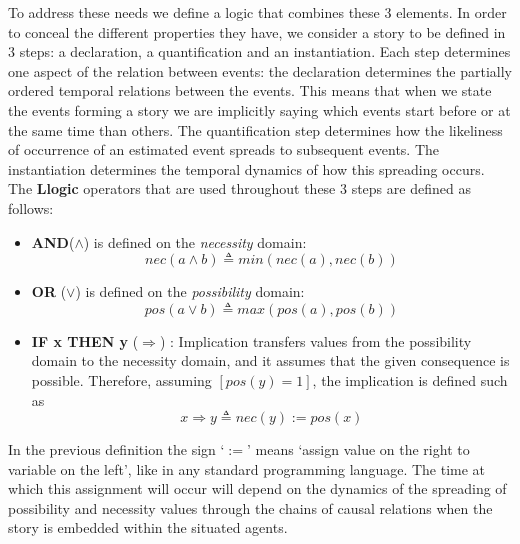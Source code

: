 \documentclass[
		twoside,openright,titlepage,numbers=noenddot,manychapters,
		headinclude,%
                footinclude=false,cleardoublepage=empty,
                BCOR=5mm,
		fontsize=11pt, %
                 enabledeprecatedfontcommands]{scrreprt}
\begin{document}
To address these needs we define a logic that combines these 3 elements. In order to conceal the different properties they have, we consider a story to be defined in 3 steps: a declaration, a quantification and an instantiation.  Each step determines one aspect of the relation between events: the declaration determines the partially ordered temporal relations between the events. This means that when we state the events forming a story we are implicitly saying which events start before or at the same time than others. The quantification step determines how the  likeliness of occurrence of an estimated event spreads to subsequent events. The instantiation determines the temporal dynamics of how this spreading occurs.  %
The \textbf{Llogic} operators that are used throughout these 3 steps %
 are defined as follows:


   \begin{itemize}
        \item  \textbf{AND}($\wedge$) is defined on the \emph{necessity} domain:
\begin{equation*}
 nec(a \wedge b)\triangleq min(nec(a),nec(b))
\end{equation*}
        \item \textbf{OR} ($\vee$) is defined on the \emph{possibility} domain:
\begin{equation*}
pos(a \vee b)\triangleq max(pos(a),pos(b))
\end{equation*}
          \item \textbf{IF x THEN y } ($\Rightarrow $) : Implication transfers values from the possibility domain to the necessity domain, and it assumes that the given consequence is possible. Therefore, assuming $[pos(y)=1]$, the implication is defined such as 
\begin{equation*} 
x \Rightarrow y \triangleq  nec(y):= pos(x) \end{equation*}
   \end{itemize}

In the previous definition the sign `$:=$' means `assign value on the right to variable on the left', like in any standard programming language. The time at which this assignment will occur will depend on the dynamics of the spreading of possibility and necessity values through the chains of causal relations %
when the story is embedded within the situated agents. 
\end{document}
